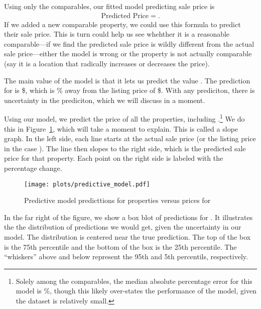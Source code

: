 \documentclass[
12pt, %
letterpaper, %
oneside, %
headinclude,footinclude, %
BCOR5mm, %
]{scrartcl}
\begin{document}
Using only the comparables, our fitted model predicting sale price is 
\begin{align*}
\mbox{Predicted Price} = .
\end{align*}
If we added a new comparable property, we could use this formula to predict their sale price.
This is turn could help us see whehther it is a reasonable comparable---if we find the predicted sale price is wildly different from the actual sale price---either the model is wrong or the property is not actually comparable (say it is a location that radically increases or decreases the price). 

The main value of the model is that it lets us predict the value \PropertyName{}.
The prediction for \PropertyName{} is \$\PropertyPricePredictionComplex{}, which is \PropertyPricePredictionComplexPercent{}\% away from the listing price of \$\PropertyPrice{}.  
With any prediciton, there is uncertainty in the prediciton, which we will discuss in a moment. 

Using our model, we predict the price of all the properties, including \PropertyName{}.\footnote{
  Solely among the comparables, the median absolute percentage error for this model is \MAPE{}\%, though this likely over-states the performance of the model, given the dataset is relatively small. 
}
We do this in Figure~\ref{fig:predictive_model}, which will take a moment to explain.
This is called a slope graph.
In the left side, each line starts at the actual sale price (or the listing price in the case \PropertyName{}).
The line then slopes to the right side, which is the predicted sale price for that property.
Each point on the right side is labeled with the percentage change. 

\begin{figure}
\centering
\caption{Predictive model predicttions for properties versus prices for \PropertyName{}} \label{fig:predictive_model}  
\texttt{[image: plots/predictive\_model.pdf]} 
\end{figure}

In the far right of the figure, we show a box blot of predictions for \PropertyName{}.
It illustrates the the distribution of predictions we would get, given the uncertainty in our model. 
The distribution is centered near the true prediction.
The top of the box is the 75th percentile and the bottom of the box is the 25th percentile.
The ``whiskers'' above and below represent the 95th and 5th percentils, respectively. 
\end{document}
